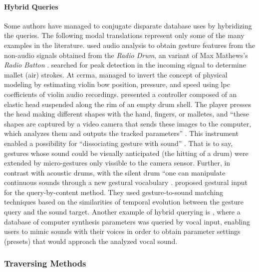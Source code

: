 \paragraph{Hybrid Queries}
\label{applications:hybrid_queries}
Some authors have managed to conjugate disparate database uses by hybridizing the queries. The following modal translations represent only some of the many examples in the literature. \textcite{icmc/bbp2372.2001.103} used audio analysis to obtain gesture features from the non-audio signals obtained from the \textit{Radio Drum}, an variant of Max Mathews's \textit{Radio Batton} \parencite{DBLP:conf/icmc/Boie89}. \textcite{icmc/bbp2372.2001.103} searched for peak detection in the incoming signal to determine mallet (air) strokes. At \gls{ccrma}, \textcite{icmc/bbp2372.2001.071} managed to invert the concept of physical modeling by estimating violin bow position, pressure, and speed using \gls{lpc} coefficients of violin audio recordings. \textcite{DBLP:conf/icmc/OliverJ08} presented a controller composed of an elastic head suspended along the rim of an empty drum shell. The player presses the head making different shapes with the hand, fingers, or malletes, and ``these shapes are captured by a video camera that sends these images to the computer, which analyzes them and outputs the tracked parameters'' \parencite[1]{DBLP:conf/icmc/OliverJ08}. This instrument enabled a possibility for ``dissociating gesture with sound'' \parencite[1]{DBLP:conf/icmc/OliverJ08}. That is to say, gestures whose sound could be visually anticipated (the hitting of a drum) were extended by micro-gestures only vissible to the camera sensor. Further, in contrast with acoustic drums, with the silent drum ``one can manipulate continuous sounds through a new gestural vocabulary \parencite[1]{DBLP:conf/icmc/OliverJ08}. \textcite{Caramiaux2011} proposed gestural input for the query-by-content method. They used gesture-to-sound matching techniques based on the similarities of temporal evolution between the gesture query and the sound target. Another example of hybrid querying is \textcite{mcartwright:2014}, where a database of computer synthesis parameters was queried by vocal input, enabling users to mimic sounds with their voices in order to obtain parameter settings (presets) that would approach the analyzed vocal sound.	

\subsubsection{Traversing Methods}

